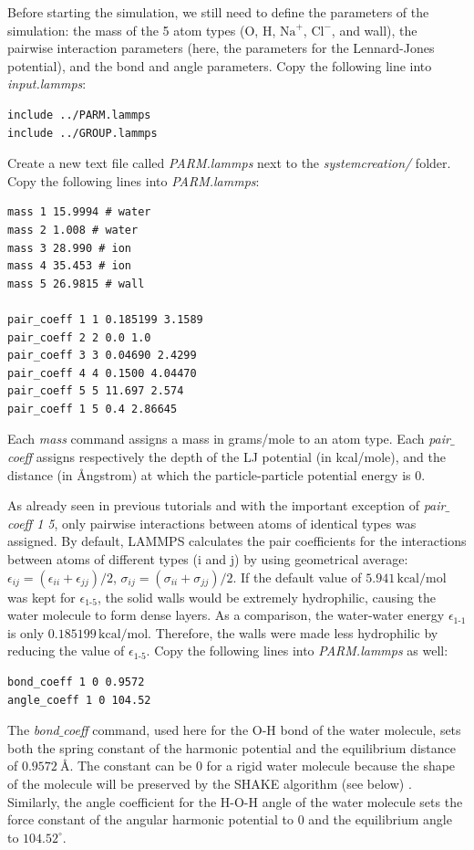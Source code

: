 \documentclass[9pt,tutorial]{livecoms}
\begin{document}
Before starting the simulation, we still need to define the parameters of the simulation: the mass of the 5 atom types (O, H, $\text{Na}^+$, $\text{Cl}^-$, and wall), the pairwise interaction parameters (here, the parameters for the Lennard-Jones potential), and the bond and angle parameters. Copy the following line into \textit{input.lammps}:
{\normalsize \begin{verbatim}
include ../PARM.lammps
include ../GROUP.lammps
\end{verbatim}}
Create a new text file called \textit{PARM.lammps} next to the \textit{systemcreation/} folder. Copy the following lines into \textit{PARM.lammps}:
{\normalsize \begin{verbatim}
mass 1 15.9994 # water
mass 2 1.008 # water
mass 3 28.990 # ion
mass 4 35.453 # ion
mass 5 26.9815 # wall

pair_coeff 1 1 0.185199 3.1589
pair_coeff 2 2 0.0 1.0
pair_coeff 3 3 0.04690 2.4299
pair_coeff 4 4 0.1500 4.04470
pair_coeff 5 5 11.697 2.574
pair_coeff 1 5 0.4 2.86645
\end{verbatim}}
Each \textit{mass} command assigns a mass in grams/mole to an atom type. Each \textit{pair$\_$coeff} assigns respectively the depth of the LJ potential (in kcal/mole), and the distance (in Ångstrom) at which the particle-particle potential energy is 0.

As already seen in previous tutorials and with the important exception of \textit{pair$\_$coeff 1 5}, only pairwise interactions between atoms of identical types was assigned. By default, LAMMPS calculates the pair coefficients for the interactions between atoms of different types (i and j) by using geometrical average: $\epsilon_{ij} = (\epsilon_{ii} + \epsilon_{jj})/2$,  $\sigma_{ij} = (\sigma_{ii} + \sigma_{jj})/2$. If the default value of $5.941\,\text{kcal/mol}$ was kept for $\epsilon_\text{1-5}$, the solid walls would be extremely hydrophilic, causing the water molecule to form dense layers. As a comparison, the water-water energy $\epsilon_\text{1-1}$ is only $0.185199\,\text{kcal/mol}$. Therefore, the walls were made less hydrophilic by reducing the value of $\epsilon_\text{1-5}$. Copy the following lines into \textit{PARM.lammps} as well:
{\normalsize \begin{verbatim}
bond_coeff 1 0 0.9572
angle_coeff 1 0 104.52
\end{verbatim}}
The \textit{bond$\_$coeff} command, used here for the O-H bond of the water molecule, sets both the spring constant of the harmonic potential and the equilibrium distance of $0.9572~\text{\AA{}}$. The constant can be 0 for a rigid water molecule because the shape of the molecule will be preserved by the SHAKE algorithm (see below) \cite{ryckaert1977numerical, andersen1983rattle}. Similarly, the angle coefficient for the H-O-H angle of the water molecule sets the force constant of the angular harmonic potential to 0 and the equilibrium angle to $104.52^\circ$.
\end{document}
